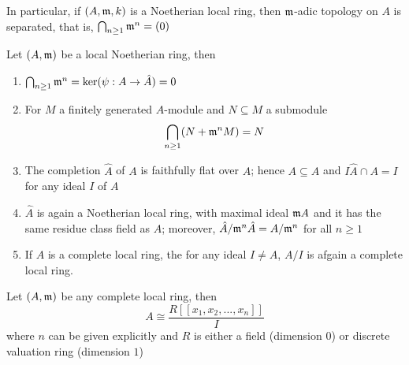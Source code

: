 \begin{remark}
	In particular, if $(A, \mathfrak{m}, k)$ is a Noetherian local ring, then $\mathfrak{m}$-adic topology on $A$ is separated, that is, $\bigcap_{n \geq 1} \mathfrak{m}^n = (0)$
\end{remark}

\begin{remark}
	Let $(A, \mathfrak{m})$ be a local Noetherian ring, then
	\begin{enumerate}
		\item $\bigcap_{n \geq 1} \mathfrak{m}^n = \ker (\psi: A \to \hat{A}) = 0$
		
		\item For $M$ a finitely generated $A$-module and $N \subseteq M$ a submodule
		$$
		\bigcap_{n \geq 1} (N + \mathfrak{m}^n M) = N
		$$
		
		\item The completion $\hat{A}$ of $A$ is faithfully flat over $A$; hence $A \subseteq \hat{A}$ and $I \hat{A} \cap A = I$ for any ideal $I$ of $A$
		
		\item $\hat{A}$ is again a Noetherian local ring, with maximal ideal $\mathfrak{m} A$ and it has the same residue class field as $A$; moreover, $\hat{A} / \mathfrak{m}^n \hat{A} = A / \mathfrak{m}^n$ for all $n \geq 1$
		
		\item If $A$ is a complete local ring, the for any ideal $I \neq A$, $A / I$ is afgain a complete local ring.
	\end{enumerate}
	
\end{remark}



\begin{theorem}
	Let $(A, \mathfrak{m})$ be any complete local ring, then 
	$$
		A \cong \frac{R[[x_1, x_2, ..., x_n]]}{I}
	$$
	where $n$ can be given explicitly and $R$ is either a field (dimension $0$) or discrete valuation ring (dimension $1$)
\end{theorem} 